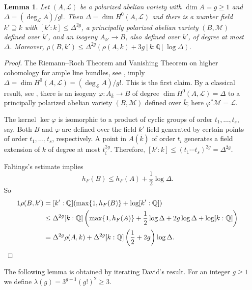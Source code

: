 \documentclass[12pt,oneside]{amsart}
\newcounter{maincounter}
\numberwithin{maincounter}{section}
\numberwithin{equation}{section}
\newtheorem{lemma}[maincounter]{Lemma}
\def\QQ{\mathbb{Q}}
\newcommand{\IQ}{{\QQ}}
\newcommand{\cL}{{\mathcal L}}
\newcommand{\cM}{{\mathcal M}}
\renewcommand{\supset}{\supseteq}
\begin{document}
\begin{lemma}
  \label{lem:ppreduction}
  Let $(A,\cL)$ be a polarized abelian
  variety with $\dim A =g\ge 1$ and
  $\Delta = (\deg_\cL A)/g!$. Then $\Delta = \dim H^0(A,\cL)$ and 
  there is a number field $k'\supset k$ 
  with $[k':k]\le \Delta^{2g}$,
  a principally polarized abelian variety $(B,\cM)$ defined over
  $k'$, and an isogeny $A_{k'}\rightarrow B$, also defined over
  $k'$, of degree at most $\Delta$. Moreover,
  $\rho(B,k')\le \Delta^{2g}(\rho(A,k) + 3g[k:\IQ]\log\Delta)$. 
\end{lemma}
\begin{proof}
  The Riemann--Roch Theorem and
  Vanishing Theorem on higher cohomology for ample line bundles,
  see \cite[Section 16]{MumfordAbVar70}, imply $\Delta=\dim H^0(A,\cL) = 
  (\deg_\cL A)/g!$. This is the first claim.
  By a classical result, see \cite[Lemme~3.5]{GR:periodsisgoenies},
  there is an isogeny $\varphi\colon A_{\overline k}\rightarrow B$ of degree
  $\dim H^0(A,\cL) =\Delta$
  to a principally polarized abelian variety $(B,\cM)$
  defined over $\overline k$; here $\varphi^* \cM = \cL$. 

  The kernel $\ker \varphi$ is isomorphic to a product of cyclic %
  groups of order $t_1,\ldots,t_s$, say. Both $B$ and $\varphi$ are
  defined over the field $k'$ field generated by certain points of order
  $t_1,\ldots,t_s$, respectively. A point in $A(\overline k)$ of order
  $t_i$ generates a field extension of $k$ of degree at most $t_i^{2g}$.
  Therefore, $[k':k]\le (t_1\cdots t_s)^{2g} = \Delta^{2g}$.

  Faltings's estimate implies
  \begin{equation*}
    h_F(B)\le h_F(A) + \frac 12 \log\Delta. %
  \end{equation*}
  So
  \begin{alignat*}1
    \rho(B,k') &= [k':\IQ] (\max\{1,h_F(B)\}+\log[k':\IQ]) \\
    &\le \Delta^{2g}[k:\IQ] \left(\max\{1,h_F(A)\}+\frac 12\log\Delta +
    2g\log\Delta +\log[k:\IQ]\right)\\
    &=\Delta^{2g} \rho(A,k)+\Delta^{2g}[k:\IQ]\left(\frac 12+2g\right)\log\Delta. \qquad \qquad \qedhere
  \end{alignat*}
\end{proof}


The following lemma is obtained by iterating David's result. For
an integer $g\ge 1$ we define $\lambda(g) = 3^{g+1}(g!)^2 \ge 3$. 
\end{document}
